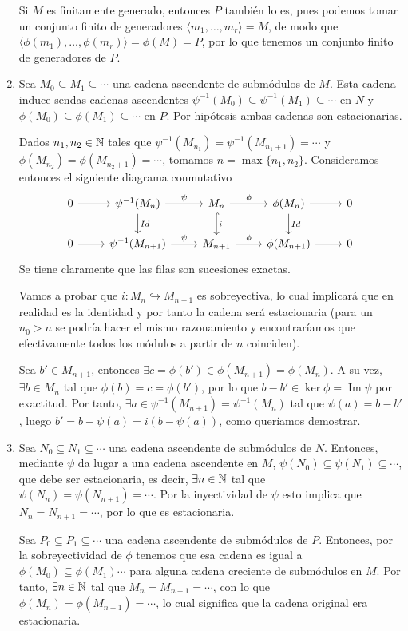 \documentclass[twoside]{article}
\DeclareMathOperator{\Ima}{Im}
\begin{document}
\begin{solucion}
\begin{enumerate}
Si $M$ es finitamente generado, entonces $P$ también lo es, pues podemos tomar un conjunto finito de generadores $\langle m_1,\dots, m_r\rangle = M$, de modo que $\langle \phi(m_1),\dots, \phi(m_r)\rangle =\phi(M)=P$, por lo que tenemos un conjunto finito de generadores de $P$.

\item Sea $M_0\subseteq M_1\subseteq\cdots$ una cadena ascendente de submódulos de $M$. Esta cadena induce sendas cadenas ascendentes $\psi^{-1}(M_0)\subseteq\psi^{-1}(M_1)\subseteq\cdots$ en $N$ y $\phi(M_0)\subseteq\phi(M_1)\subseteq\cdots$ en $P$. Por hipótesis ambas cadenas son estacionarias. 

Dados $n_1,n_2\in\mathbb{N}$ tales que $\psi^{-1}(M_{n_1})=\psi^{-1}(M_{n_1+1})=\cdots$ y $\phi(M_{n_2})=\phi(M_{n_2+1})=\cdots$, tomamos $n=\max\{n_1,n_2\}$. Consideramos entonces el siguiente diagrama conmutativo
\[
\begin{tikzcd}
0\arrow[r] & \psi^{-1}(M_{n})\arrow[r,"\psi"]\arrow[d, "Id"] & M_n\arrow[r,"\phi"]\arrow[d, hookrightarrow, "i"] & \phi(M_{n})\arrow[d,"Id"]\arrow[r] & 0\\
0\arrow[r] & \psi^{-1}(M_{n+1})\arrow[r,"\psi"]& M_{n+1}\arrow[r,"\phi"] & \phi(M_{n+1})\arrow[r] & 0
\end{tikzcd}
\]
Se tiene claramente que las filas son sucesiones exactas. 

Vamos a probar que $i:M_n\hookrightarrow M_{n+1}$ es sobreyectiva, lo cual implicará que en realidad es la identidad y por tanto la cadena será estacionaria (para un $n_0>n$ se podría hacer el mismo razonamiento y encontraríamos que efectivamente todos los módulos a partir de $n$ coinciden).

Sea $b'\in M_{n+1}$, entonces $\exists c=\phi(b')\in\phi(M_{n+1})=\phi(M_n)$. A su vez, $\exists b\in M_n$ tal que $\phi(b)=c=\phi(b')$, por lo que $b-b'\in\ker\phi=\Ima\psi$ por exactitud. Por tanto, $\exists a\in\psi^{-1}(M_{n+1})=\psi^{-1}(M_n)$ tal que $\psi(a)=b-b'$, luego $b'=b-\psi(a)=i(b-\psi(a))$, como queríamos demostrar.
 
  
\item Sea $N_0\subseteq N_1\subseteq\cdots$ una cadena ascendente de submódulos de $N$. Entonces, mediante $\psi$ da lugar a una cadena ascendente en $M$, $\psi(N_0)\subseteq \psi(N_1)\subseteq\cdots$, que debe ser estacionaria, es decir, $\exists n\in\mathbb{N}$ tal que $\psi(N_n)=\psi(N_{n+1})=\cdots$. Por la inyectividad de $\psi$ esto implica que $N_n=N_{n+1}=\cdots$, por lo que es estacionaria. 

Sea $P_0\subseteq P_1\subseteq\cdots$ una cadena ascendente de submódulos de $P$. Entonces, por la sobreyectividad de $\phi$ tenemos que esa cadena es igual a $\phi(M_0)\subseteq\phi(M_1)\cdots$ para alguna cadena creciente de submódulos en $M$. Por tanto, $\exists n\in\mathbb{N}$ tal que $M_n=M_{n+1}=\cdots$, con lo que $\phi(M_n)=\phi(M_{n+1})=\cdots$, lo cual significa que la cadena original era estacionaria. 
\end{enumerate}
\end{solucion}
\end{document}
